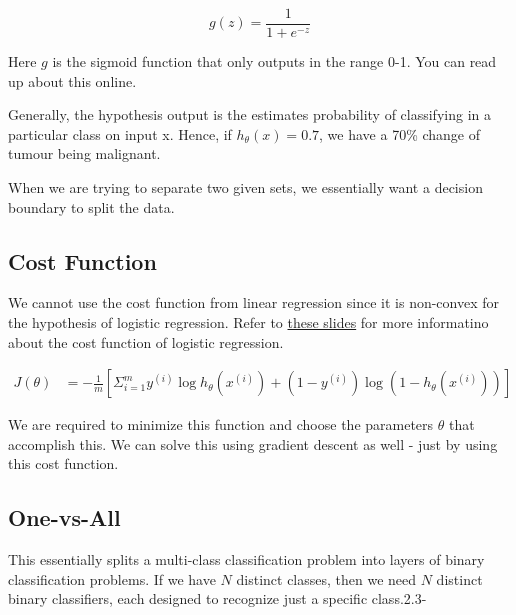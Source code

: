 \begin{equation}
    g(z) = \frac{1}{1 + e^{-z}}
\end{equation}

Here $g$ is the sigmoid function that only outputs in the range 0-1. You can read up about this online.

Generally, the hypothesis output is the estimates probability of classifying in a particular class on input x. Hence, if $h_{\theta}(x)=0.7$, we have a 70\% change of tumour being malignant.  

When we are trying to separate two given sets, we essentially want a decision boundary to split the data.

\subsection{Cost Function}

We cannot use the cost function from linear regression since it is non-convex for the hypothesis of logistic regression. Refer to \href{https://github.com/RoboticsIIITH/summer-sessions-2020/blob/master/lecture-slides/deep_learning/logistic-regression.pdf}{these slides} for more informatino about the cost function of logistic regression. 

\begin{equation}
\begin{split}
    J(\theta) &= -\frac{1}{m} [\Sigma_{i=1}^{m} y^{(i)}\log h_{\theta}(x^{(i)}) + (1 - y^{(i)})\log (1-h_{\theta}(x^{(i)}))]
\end{split}
\end{equation}

We are required to minimize this function and choose the parameters $\theta$ that accomplish this. We can solve this using gradient descent as well - just by using this cost function.

\subsection{One-vs-All}

This essentially splits a multi-class classification problem into layers of binary classification problems. If we have $N$ distinct classes, then we need $N$ distinct binary classifiers, each designed to recognize just a specific class.2.3-